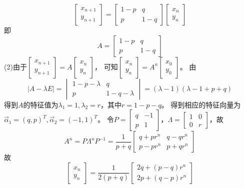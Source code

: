 \begin{equation*}
\begin{bmatrix}x_{n+1}\\y_{n+1}\end{bmatrix}=
\begin{bmatrix}1-p&q\\p&1-q\end{bmatrix}
\begin{bmatrix}x_n\\y_n\end{bmatrix}
\end{equation*}
即
\begin{equation*}
A=\begin{bmatrix}1-p&q\\p&1-q\end{bmatrix}
\end{equation*}
(2)由于$\begin{bmatrix}x_{n+1}\\y_{n+1}\end{bmatrix}=A\begin{bmatrix}x_n\\y_n\end{bmatrix}$，
可知$\begin{bmatrix}x_{n}\\y_{n}\end{bmatrix}=A^n\begin{bmatrix}x_0\\y_0\end{bmatrix}$。
由
\begin{equation*}
  |A-\lambda E|=\begin{vmatrix}1-p-\lambda&q\\p&1-q-\lambda\end{vmatrix}=(\lambda-1)(\lambda-1+p+q)
\end{equation*}
得到$A$的特征值为$\lambda_1=1,\lambda_2=r$，其中$r=1-p-q$。
得到相应的特征向量为$\vec{\alpha}_1=(q,p)^T,\vec{\alpha}_2=(-1,1)^T$。
令$P=\begin{bmatrix}q&-1\\p&1\end{bmatrix}$，$\Lambda=\begin{bmatrix}1&0\\0&r\end{bmatrix}$，故
\begin{equation*}
  A^n=P\Lambda^nP^{-1}=\frac{1}{p+q}\begin{bmatrix}q+pr^n&q-qr^n\\p-pr^n&p+qr^n\end{bmatrix}
\end{equation*}
故
\begin{equation*}
 \begin{bmatrix}x_{n}\\y_{n}\end{bmatrix}=\frac{1}{2(p+q)}\begin{bmatrix}2q+(p-q)r^n\\2p+(q-p)r^n\end{bmatrix}
\end{equation*}

